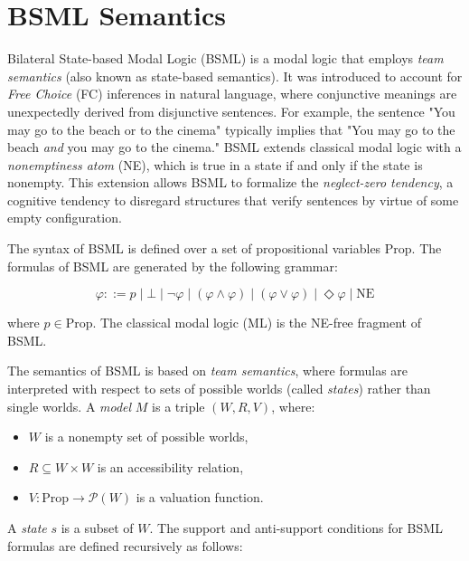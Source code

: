 \section{BSML Semantics}\label{BSML Semantics}

Bilateral State-based Modal Logic (BSML) is a modal logic that employs \textit{team semantics} (also known as state-based semantics). It was introduced to account for \textit{Free Choice} (FC) inferences in natural language, where conjunctive meanings are unexpectedly derived from disjunctive sentences. For example, the sentence "You may go to the beach or to the cinema" typically implies that "You may go to the beach \textit{and} you may go to the cinema." BSML extends classical modal logic with a \textit{nonemptiness atom} (NE), which is true in a state if and only if the state is nonempty. This extension allows BSML to formalize the \textit{neglect-zero tendency}, a cognitive tendency to disregard structures that verify sentences by virtue of some empty configuration.





The syntax of BSML is defined over a set of propositional variables \(\text{Prop}\). The formulas of BSML are generated by the following grammar:

\[
\varphi ::= p \mid \bot \mid \neg \varphi \mid (\varphi \land \varphi) \mid (\varphi \lor \varphi) \mid \Diamond \varphi \mid \text{NE}
\]

where \(p \in \text{Prop}\). The classical modal logic (ML) is the NE-free fragment of BSML.

The semantics of BSML is based on \textit{team semantics}, where formulas are interpreted with respect to sets of possible worlds (called \textit{states}) rather than single worlds. A \textit{model} \(M\) is a triple \((W, R, V)\), where:
\begin{itemize}
    \item \(W\) is a nonempty set of possible worlds,
    \item \(R \subseteq W \times W\) is an accessibility relation,
    \item \(V: \text{Prop} \to \mathcal{P}(W)\) is a valuation function.
\end{itemize}

A \textit{state} \(s\) is a subset of \(W\). The support and anti-support conditions for BSML formulas are defined recursively as follows:

